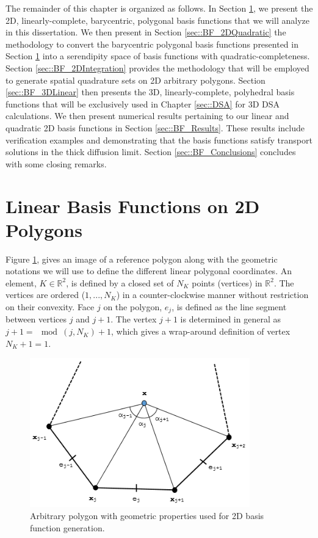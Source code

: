 The remainder of this chapter is organized as follows. In Section \ref{sec::BF_2DLinear}, we present the 2D, linearly-complete, barycentric, polygonal basis functions that we will analyze in this dissertation. We then present in Section \ref{sec::BF_2DQuadratic} the methodology to convert the barycentric polygonal basis functions presented in Section \ref{sec::BF_2DLinear} into a serendipity space of basis functions with quadratic-completeness. Section \ref{sec::BF_2DIntegration} provides the methodology that will be employed to generate spatial quadrature sets on 2D arbitrary polygons. Section \ref{sec::BF_3DLinear} then presents the 3D, linearly-complete, polyhedral basis functions that will be exclusively used in Chapter \ref{sec::DSA} for 3D DSA calculations. We then present numerical results pertaining to our linear and quadratic 2D basis functions in Section \ref{sec::BF_Results}. These results include verification examples and demonstrating that the basis functions satisfy transport solutions in the thick diffusion limit. Section \ref{sec::BF_Conclusions} concludes with some closing remarks.

\section{Linear Basis Functions on 2D Polygons}
\label{sec::BF_2DLinear}

Figure \ref{fig::BF_2D_ref_polygon}, gives an image of a reference polygon along with the geometric notations we will use to define the different linear polygonal coordinates. An element, $K\in \mathbb{R}^2$, is defined by a closed set of $N_K$ points (vertices) in $\mathbb{R}^2$. The vertices are ordered ($1,...,N_K$) in a counter-clockwise manner without restriction on their convexity. Face $j$ on the polygon, $e_j$, is defined as the line segment between vertices $j$ and $j+1$. The vertex $j+1$ is determined in general as $j+1 =\mod(j,N_K)+1$, which gives a wrap-around definition of vertex $N_K+1 = 1$.

\begin{figure}
\centering
\includegraphics[width=0.85\textwidth]{figures/sec_BF/ref_polygon_Rev1.png}
\caption{Arbitrary polygon with geometric properties used for 2D basis function generation.}
\label{fig::BF_2D_ref_polygon}
\end{figure}

